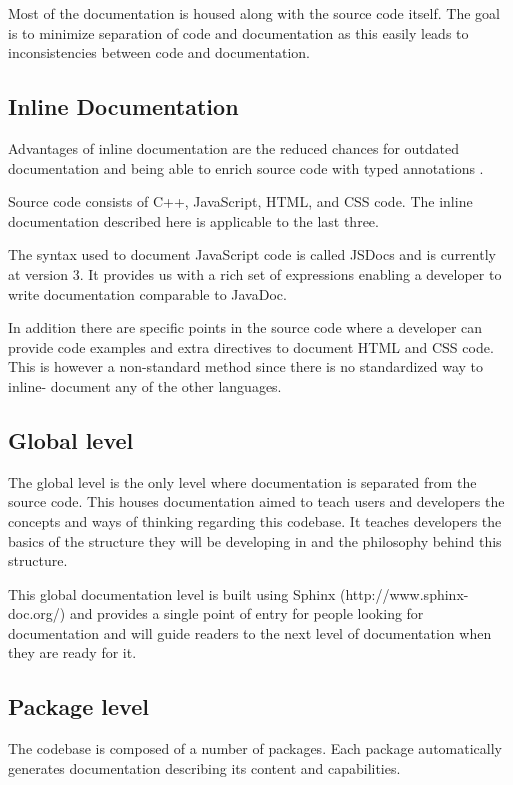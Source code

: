 \documentclass[journal,compsoc,a4paper]{IEEEtran}
\begin{document}
Most of the documentation is housed along with the source code itself. The goal
is to minimize separation of code and documentation as this easily leads to
inconsistencies between code and documentation.

\subsection{Inline Documentation}
Advantages of inline documentation are the reduced chances for outdated
documentation and being able to enrich source code with typed annotations
\cite{JS_Annotations}.

Source code consists of C++, JavaScript, HTML, and CSS code. The inline
documentation described here is applicable to the last three.

The syntax used to document JavaScript code is called JSDocs and is currently
at version 3\cite{JS_Annotations}\cite{JSDoc}. It provides us with a rich set of expressions
enabling a developer to write documentation comparable to JavaDoc.

In addition there are specific points in the source code where a developer can
provide code examples and extra directives to document HTML and CSS code. This
is however a non-standard method since there is no standardized way to inline-
document any of the other languages.

\subsection{Global level}
The global level is the only level where documentation is separated from the source code.
This houses documentation aimed to teach users and developers the concepts and
ways of thinking regarding this codebase.
It teaches developers the basics of the structure they will be developing in and
the philosophy behind this structure.

This global documentation level is built using Sphinx (http://www.sphinx-doc.org/)
and provides a single point of entry for people looking for documentation and
will guide readers to the next level of documentation when they are ready for it.

\subsection{Package level}
The codebase is composed of a number of packages. Each package automatically
generates documentation describing its content and capabilities.
\end{document}
